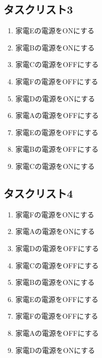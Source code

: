 \documentclass[a4j,12pt,twoside]{jreport}
\begin{document}
\begin{multicols}{2}
\subsection*{タスクリスト3}
	\begin{enumerate}
		\item 家電Eの電源をONにする
		\item 家電Bの電源をONにする	
		\item 家電Cの電源をOFFにする
		\item 家電Fの電源をOFFにする
		\item 家電Dの電源をONにする
		\item 家電Aの電源をOFFにする
		\item 家電Eの電源をOFFにする
		\item 家電Bの電源をOFFにする
		\item 家電Cの電源をONにする
	\end{enumerate}
\subsection*{タスクリスト4}
	\begin{enumerate}
		\item 家電Fの電源をONにする
		\item 家電Aの電源をONにする
		\item 家電Dの電源をOFFにする
		\item 家電Cの電源をOFFにする
		\item 家電Bの電源をONにする
		\item 家電Eの電源をOFFにする
		\item 家電Fの電源をOFFにする
		\item 家電Aの電源をOFFにする
		\item 家電Dの電源をONにする
	\end{enumerate}
\end{multicols}	


\newpage
\end{document}
